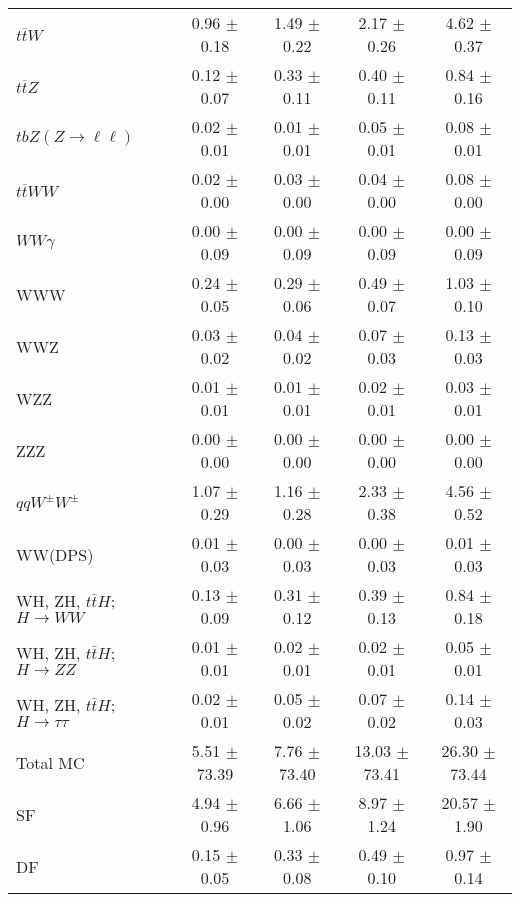 \begin{tabular}{l|cccc}
                   $t\overline{t}W$ &  0.96 $\pm$  0.18 &  1.49 $\pm$  0.22 &  2.17 $\pm$  0.26 &  4.62 $\pm$  0.37 \\
                   $t\overline{t}Z$ &  0.12 $\pm$  0.07 &  0.33 $\pm$  0.11 &  0.40 $\pm$  0.11 &  0.84 $\pm$  0.16 \\
    $tbZ (Z \rightarrow \ell \ell)$ &  0.02 $\pm$  0.01 &  0.01 $\pm$  0.01 &  0.05 $\pm$  0.01 &  0.08 $\pm$  0.01 \\
                  $t\overline{t}WW$ &  0.02 $\pm$  0.00 &  0.03 $\pm$  0.00 &  0.04 $\pm$  0.00 &  0.08 $\pm$  0.00 \\
                         $WW\gamma$ &  0.00 $\pm$  0.09 &  0.00 $\pm$  0.09 &  0.00 $\pm$  0.09 &  0.00 $\pm$  0.09 \\
                                WWW &  0.24 $\pm$  0.05 &  0.29 $\pm$  0.06 &  0.49 $\pm$  0.07 &  1.03 $\pm$  0.10 \\
                                WWZ &  0.03 $\pm$  0.02 &  0.04 $\pm$  0.02 &  0.07 $\pm$  0.03 &  0.13 $\pm$  0.03 \\
                                WZZ &  0.01 $\pm$  0.01 &  0.01 $\pm$  0.01 &  0.02 $\pm$  0.01 &  0.03 $\pm$  0.01 \\
                                ZZZ &  0.00 $\pm$  0.00 &  0.00 $\pm$  0.00 &  0.00 $\pm$  0.00 &  0.00 $\pm$  0.00 \\
                 $qqW^{\pm}W^{\pm}$ &  1.07 $\pm$  0.29 &  1.16 $\pm$  0.28 &  2.33 $\pm$  0.38 &  4.56 $\pm$  0.52 \\
                            WW(DPS) &  0.01 $\pm$  0.03 &  0.00 $\pm$  0.03 &  0.00 $\pm$  0.03 &  0.01 $\pm$  0.03 \\
WH, ZH, $t\bar{t}H$; $H \rightarrow WW$ &  0.13 $\pm$  0.09 &  0.31 $\pm$  0.12 &  0.39 $\pm$  0.13 &  0.84 $\pm$  0.18 \\
WH, ZH, $t\bar{t}H$; $H \rightarrow ZZ$ &  0.01 $\pm$  0.01 &  0.02 $\pm$  0.01 &  0.02 $\pm$  0.01 &  0.05 $\pm$  0.01 \\
WH, ZH, $t\bar{t}H$; $H \rightarrow \tau\tau$ &  0.02 $\pm$  0.01 &  0.05 $\pm$  0.02 &  0.07 $\pm$  0.02 &  0.14 $\pm$  0.03 \\
\hline\hline
                           Total MC &  5.51 $\pm$ 73.39 &  7.76 $\pm$ 73.40 & 13.03 $\pm$ 73.41 & 26.30 $\pm$ 73.44 \\
\hline
                                 SF &  4.94 $\pm$  0.96 &  6.66 $\pm$  1.06 &  8.97 $\pm$  1.24 & 20.57 $\pm$  1.90 \\
                                 DF &  0.15 $\pm$  0.05 &  0.33 $\pm$  0.08 &  0.49 $\pm$  0.10 &  0.97 $\pm$  0.14 \\

\end{tabular}
